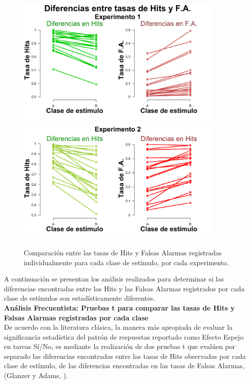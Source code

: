 \begin{figure}[p]
\centering
\includegraphics[width=0.9\textwidth]{Figures/Diff_Rate_E1}\\ 
\includegraphics[width=0.9\textwidth]{Figures/Diff_Rate_E2}\\
\decoRule
\caption[Resultados: Comparación entre las tasas de Hits y las tasas de Falsas Alarmas registradas por cada clase de estímulo]{Comparación entre las tasas de Hits y Falsas Alarmas registradas individualmente para cada clase de estímulo, por cada experimento.}
\label{fig:Diff_Rate}
\end{figure}

A continuación se presentan los análisis realizados para determinar si las diferencias encontradas entre los Hits y las Falsas Alarmas registrados por cada clase de estímulos son estadísticamente diferentes.\\

\textbf{Análisis Frecuentista: Pruebas t para comparar las tasas de Hits y Falsas Alarmas registradas por cada clase}\\

De acuerdo con la literatura clásica, la manera más apropiada de evaluar la significancia estadística del patrón de respuestas reportado como Efecto Espejo en tareas Sí/No, es mediante la realización de dos pruebas t que evalúen por separado las diferencias encontradas entre las tasas de Hits observadas por cada clase de estímulo, de las diferencias encontradas en las tasas de Falsas Alarmas, (Glanzer y Adams, \citeyear{Glanzer1990}).\\


